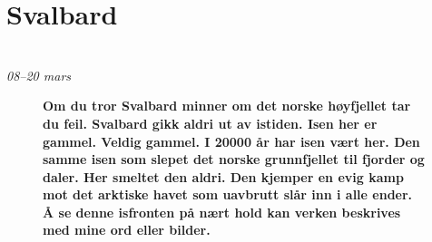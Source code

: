 \chapter*{Svalbard}\\ {\footnotesize \textit{08--20 mars}}

\begin{figure}[H]
	\centering
\noindent{}
	\caption*{\textbf{Om du tror Svalbard minner om det norske høyfjellet tar du feil.
Svalbard gikk aldri ut av istiden.
Isen
her er gammel. Veldig gammel. I 20000 år har isen vært her.  
Den samme isen som
slepet det norske grunnfjellet til fjorder og daler. Her smeltet den
aldri. Den kjemper en evig kamp mot det arktiske havet som uavbrutt slår inn i alle ender. Å se denne isfronten på nært hold kan
verken beskrives med mine ord eller bilder.}}

	\label{fig:stianglacier}
\end{figure}



